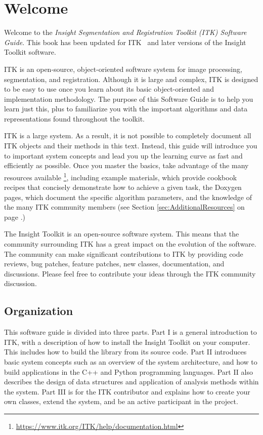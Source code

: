 \chapter{Welcome}
\label{chapter:Introduction}

Welcome to the \emph{Insight Segmentation and Registration Toolkit (ITK)
Software Guide}. This book has been updated for ITK \ITKVERSIONMAJORMINORPATCH
\ and later versions of the Insight Toolkit software.

ITK is an open-source, object-oriented software system for image processing,
segmentation, and registration. Although it is large and complex, ITK is
designed to be easy to use once you learn about its basic object-oriented and
implementation methodology. The purpose of this Software Guide is
to help you learn just this, plus to familiarize you with the important
algorithms and data representations found throughout the toolkit.

ITK is a large system. As a result, it is not possible to completely document
all ITK objects and their methods in this text. Instead, this guide will
introduce you to important system concepts and lead you up the learning curve
as fast and efficiently as possible. Once you master the basics, take
advantage of the many resources available
\footnote{\url{https://www.itk.org/ITK/help/documentation.html}}, including example
materials, which provide cookbook recipes that concisely demonstrate how to
achieve a given task, the Doxygen pages, which document the specific algorithm
parameters, and the knowledge of the many ITK community members (see Section
\ref{sec:AdditionalResources} on page \pageref{sec:AdditionalResources}.)

The Insight Toolkit is an open-source software system. This means that the
community surrounding ITK has a great impact on the evolution of the software.
The community can make significant contributions to ITK by providing code
reviews, bug patches, feature patches, new classes, documentation, and
discussions. Please feel free to contribute your ideas through the ITK
community discussion.

\section{Organization}
\label{sec:Organization}

This software guide is divided into three parts. Part I is a general
introduction to ITK, with a description of how to install the Insight
Toolkit on your computer. This includes how to build the library from its
source code. Part II introduces basic system concepts such as an overview of
the system architecture, and how to build applications in the C++ and Python
programming languages. Part II also describes the design of data structures
and application of analysis methods within the system.  Part III is for the
ITK contributor and explains how to create your own classes, extend the
system, and be an active participant in the project.

